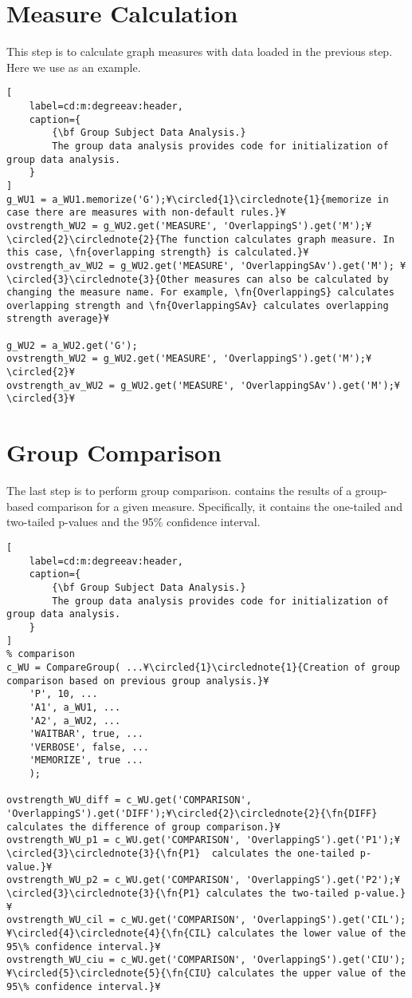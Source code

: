 \documentclass{tufte-handout}
\begin{document}
\section{Measure Calculation}
This step is to calculate graph measures with data loaded in the previous step. Here we use  as an example.
\begin{lstlisting}[
	label=cd:m:degreeav:header,
	caption={
		{\bf Group Subject Data Analysis.}
		The group data analysis provides code for initialization of group data analysis.
	}
]
g_WU1 = a_WU1.memorize('G');¥\circled{1}\circlednote{1}{memorize in case there are measures with non-default rules.}¥
ovstrength_WU2 = g_WU2.get('MEASURE', 'OverlappingS').get('M');¥\circled{2}\circlednote{2}{The function calculates graph measure. In this case, \fn{overlapping strength} is calculated.}¥
ovstrength_av_WU2 = g_WU2.get('MEASURE', 'OverlappingSAv').get('M'); ¥\circled{3}\circlednote{3}{Other measures can also be calculated by changing the measure name. For example, \fn{OverlappingS} calculates overlapping strength and \fn{OverlappingSAv} calculates overlapping strength average}¥

g_WU2 = a_WU2.get('G');
ovstrength_WU2 = g_WU2.get('MEASURE', 'OverlappingS').get('M');¥\circled{2}¥
ovstrength_av_WU2 = g_WU2.get('MEASURE', 'OverlappingSAv').get('M');¥\circled{3}¥
\end{lstlisting}


\clearpage
\section{Group Comparison}
The last step is to perform group comparison.  contains the results of a group-based comparison for a given measure.
Specifically, it contains the one-tailed and two-tailed p-values and the 95\% confidence interval.
\begin{lstlisting}[
	label=cd:m:degreeav:header,
	caption={
		{\bf Group Subject Data Analysis.}
		The group data analysis provides code for initialization of group data analysis.
	}
]
% comparison
c_WU = CompareGroup( ...¥\circled{1}\circlednote{1}{Creation of group comparison based on previous group analysis.}¥
    'P', 10, ...
    'A1', a_WU1, ...
    'A2', a_WU2, ...
    'WAITBAR', true, ...
    'VERBOSE', false, ...
    'MEMORIZE', true ...
    );

ovstrength_WU_diff = c_WU.get('COMPARISON', 'OverlappingS').get('DIFF');¥\circled{2}\circlednote{2}{\fn{DIFF} calculates the difference of group comparison.}¥
ovstrength_WU_p1 = c_WU.get('COMPARISON', 'OverlappingS').get('P1');¥\circled{3}\circlednote{3}{\fn{P1}  calculates the one-tailed p-value.}¥
ovstrength_WU_p2 = c_WU.get('COMPARISON', 'OverlappingS').get('P2');¥\circled{3}\circlednote{3}{\fn{P1} calculates the two-tailed p-value.}¥
ovstrength_WU_cil = c_WU.get('COMPARISON', 'OverlappingS').get('CIL');¥\circled{4}\circlednote{4}{\fn{CIL} calculates the lower value of the 95\% confidence interval.}¥
ovstrength_WU_ciu = c_WU.get('COMPARISON', 'OverlappingS').get('CIU');¥\circled{5}\circlednote{5}{\fn{CIU} calculates the upper value of the 95\% confidence interval.}¥
\end{lstlisting}


\end{document}
